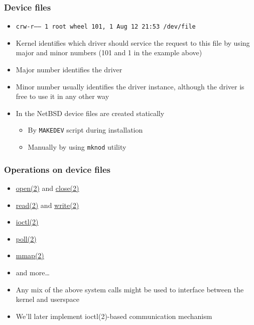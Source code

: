 \documentclass[dvipsnames,table]{beamer}
\begin{document}
\begin{frame}
\frametitle{Device files}
\begin{itemize}
	\scriptsize
	\item {\tt crw-r-----  1 root  wheel  101, 1 Aug 12 21:53 /dev/file}
	\normalsize
	\item Kernel identifies which driver should service the request to this file by using major and minor numbers (101 and 1 in the example above)
	\item Major number identifies the driver
	\item Minor number usually identifies the driver instance, although the driver is free to use it in any other way
	\item In the NetBSD device files are created statically
	\begin{itemize}
		\item By {\tt MAKEDEV} script during installation
		\item Manually by using {\tt mknod} utility
	\end{itemize}
\end{itemize}
\end{frame}

\begin{frame}
\frametitle{Operations on device files}
\begin{itemize}
	\item \href{http://netbsd.gw.com/cgi-bin/man-cgi?read++NetBSD-current}{open(2)} and \href{http://netbsd.gw.com/cgi-bin/man-cgi?read++NetBSD-current}{close(2)}
	\item \href{http://netbsd.gw.com/cgi-bin/man-cgi?read++NetBSD-current}{read(2)} and \href{http://netbsd.gw.com/cgi-bin/man-cgi?write++NetBSD-current}{write(2)}
	\item \href{http://netbsd.gw.com/cgi-bin/man-cgi?write++NetBSD-current}{ioctl(2)}
	\item \href{http://netbsd.gw.com/cgi-bin/man-cgi?poll++NetBSD-current}{poll(2)}
	\item \href{http://netbsd.gw.com/cgi-bin/man-cgi?write++NetBSD-current}{mmap(2)}
	\item and more\dots
	\item Any mix of the above system calls might be used to interface between the kernel and userspace
	\item We'll later implement ioctl(2)-based communication mechanism

\end{itemize}
\end{frame}
\end{document}
